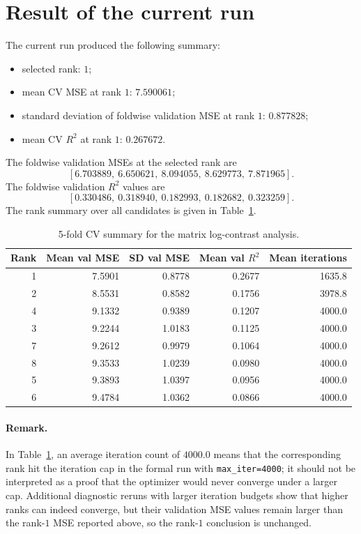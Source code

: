 \documentclass[11pt]{article}
\begin{document}
\section{Result of the current run}
The current run produced the following summary:
\begin{itemize}[leftmargin=2em]
    \item selected rank: \(1\);
    \item mean CV MSE at rank \(1\): \(7.590061\);
    \item standard deviation of foldwise validation MSE at rank \(1\): \(0.877828\);
    \item mean CV \(R^2\) at rank \(1\): \(0.267672\).
\end{itemize}
The foldwise validation MSEs at the selected rank are
\[
[6.703889,\ 6.650621,\ 8.094055,\ 8.629773,\ 7.871965].
\]
The foldwise validation \(R^2\) values are
\[
[0.330486,\ 0.318940,\ 0.182993,\ 0.182682,\ 0.323259].
\]
The rank summary over all candidates is given in Table~\ref{tab:rank-summary}.

\begin{table}[!ht]
\centering
\caption{5-fold CV summary for the matrix log-contrast analysis.}
\label{tab:rank-summary}
\begin{tabular}{rrrrr}
\toprule
Rank & Mean val MSE & SD val MSE & Mean val \(R^2\) & Mean iterations \\
\midrule
1 & 7.5901 & 0.8778 & 0.2677 & 1635.8 \\
2 & 8.5531 & 0.8582 & 0.1756 & 3978.8 \\
4 & 9.1332 & 0.9389 & 0.1207 & 4000.0 \\
3 & 9.2244 & 1.0183 & 0.1125 & 4000.0 \\
7 & 9.2612 & 0.9979 & 0.1064 & 4000.0 \\
8 & 9.3533 & 1.0239 & 0.0980 & 4000.0 \\
5 & 9.3893 & 1.0397 & 0.0956 & 4000.0 \\
6 & 9.4784 & 1.0362 & 0.0866 & 4000.0 \\
\bottomrule
\end{tabular}
\end{table}

\paragraph{Remark.}
In Table~\ref{tab:rank-summary}, an average iteration count of \(4000.0\) means that the corresponding rank hit the iteration cap in the
formal run with \texttt{max\_iter=4000}; it should not be interpreted as a proof that the optimizer would never converge under a larger cap.
Additional diagnostic reruns with larger iteration budgets show that higher ranks can indeed converge, but their validation MSE values remain
larger than the rank-\(1\) MSE reported above, so the rank-\(1\) conclusion is unchanged.
\end{document}
